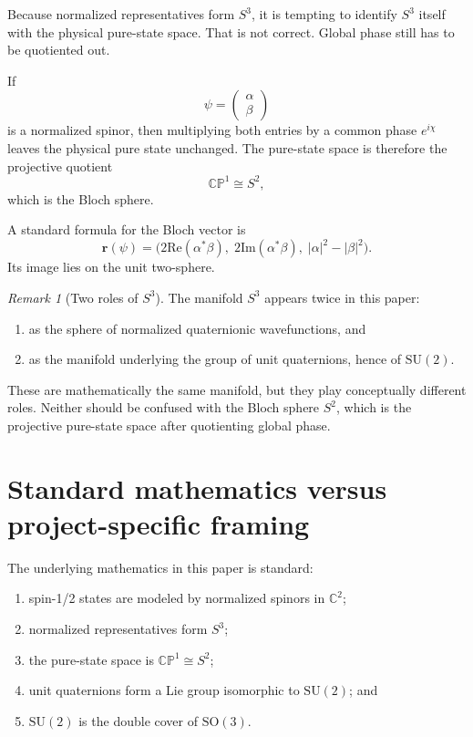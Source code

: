 \documentclass[11pt]{article}
\theoremstyle{remark}
\newtheorem{remark}[definition]{Remark}
\newcommand{\C}{\mathbb{C}}
\newcommand{\SU}{\mathrm{SU}}
\newcommand{\SO}{\mathrm{SO}}
\newcommand{\CP}{\mathbb{CP}}
\newcommand{\abs}[1]{\left\lvert #1 \right\rvert}
\begin{document}
Because normalized representatives form $S^3$, it is tempting to identify $S^3$ itself with the physical pure-state space. That is not correct. Global phase still has to be quotiented out.

If
\[
\psi = \begin{pmatrix}\alpha \\ \beta\end{pmatrix}
\]
is a normalized spinor, then multiplying both entries by a common phase $e^{i\chi}$ leaves the physical pure state unchanged. The pure-state space is therefore the projective quotient
\[
\CP^1 \cong S^2,
\]
which is the Bloch sphere.

A standard formula for the Bloch vector is
\[
\mathbf r(\psi)=\bigl(2\mathrm{Re}(\alpha^\ast\beta),\;2\mathrm{Im}(\alpha^\ast\beta),\;\abs{\alpha}^2-\abs{\beta}^2\bigr).
\]
Its image lies on the unit two-sphere.

\begin{remark}[Two roles of $S^3$]
The manifold $S^3$ appears twice in this paper:
\begin{enumerate}
\item as the sphere of normalized quaternionic wavefunctions, and
\item as the manifold underlying the group of unit quaternions, hence of $\SU(2)$.
\end{enumerate}
These are mathematically the same manifold, but they play conceptually different roles. Neither should be confused with the Bloch sphere $S^2$, which is the projective pure-state space after quotienting global phase.
\end{remark}

\section{Standard mathematics versus project-specific framing}

The underlying mathematics in this paper is standard:
\begin{enumerate}
\item spin-1/2 states are modeled by normalized spinors in $\C^2$;
\item normalized representatives form $S^3$;
\item the pure-state space is $\CP^1\cong S^2$;
\item unit quaternions form a Lie group isomorphic to $\SU(2)$; and
\item $\SU(2)$ is the double cover of $\SO(3)$.
\end{enumerate}
\end{document}
